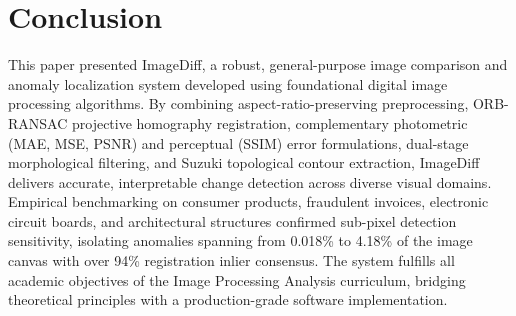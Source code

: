 \documentclass[conference]{IEEEtran}
\begin{document}
\section{Conclusion}
This paper presented ImageDiff, a robust, general-purpose image comparison and anomaly localization system developed using foundational digital image processing algorithms. By combining aspect-ratio-preserving preprocessing, ORB-RANSAC projective homography registration, complementary photometric (MAE, MSE, PSNR) and perceptual (SSIM) error formulations, dual-stage morphological filtering, and Suzuki topological contour extraction, ImageDiff delivers accurate, interpretable change detection across diverse visual domains. Empirical benchmarking on consumer products, fraudulent invoices, electronic circuit boards, and architectural structures confirmed sub-pixel detection sensitivity, isolating anomalies spanning from 0.018\% to 4.18\% of the image canvas with over 94\% registration inlier consensus. The system fulfills all academic objectives of the Image Processing Analysis curriculum, bridging theoretical principles with a production-grade software implementation.
\end{document}
